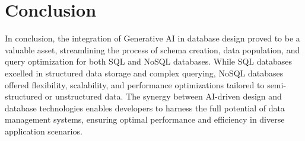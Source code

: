 \documentclass{article}
\begin{document}
\section{Conclusion}
In conclusion, the integration of Generative AI in database design proved to be a valuable asset, streamlining the process of schema creation, data population, and query optimization for both SQL and NoSQL databases. While SQL databases excelled in structured data storage and complex querying, NoSQL databases offered flexibility, scalability, and performance optimizations tailored to semi-structured or unstructured data. The synergy between AI-driven design and database technologies enables developers to harness the full potential of data management systems, ensuring optimal performance and efficiency in diverse application scenarios.
\end{document}
